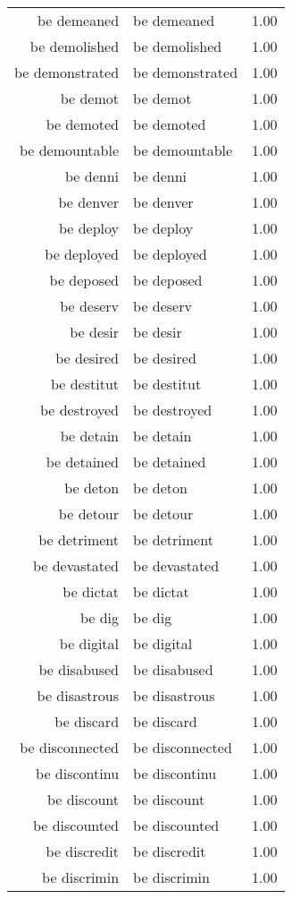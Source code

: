 \begin{table}[ht]
\begin{tabular}{rlr}
  be demeaned & be demeaned & 1.00 \\ 
  be demolished & be demolished & 1.00 \\ 
  be demonstrated & be demonstrated & 1.00 \\ 
  be demot & be demot & 1.00 \\ 
  be demoted & be demoted & 1.00 \\ 
  be demountable & be demountable & 1.00 \\ 
  be denni & be denni & 1.00 \\ 
  be denver & be denver & 1.00 \\ 
  be deploy & be deploy & 1.00 \\ 
  be deployed & be deployed & 1.00 \\ 
  be deposed & be deposed & 1.00 \\ 
  be deserv & be deserv & 1.00 \\ 
  be desir & be desir & 1.00 \\ 
  be desired & be desired & 1.00 \\ 
  be destitut & be destitut & 1.00 \\ 
  be destroyed & be destroyed & 1.00 \\ 
  be detain & be detain & 1.00 \\ 
  be detained & be detained & 1.00 \\ 
  be deton & be deton & 1.00 \\ 
  be detour & be detour & 1.00 \\ 
  be detriment & be detriment & 1.00 \\ 
  be devastated & be devastated & 1.00 \\ 
  be dictat & be dictat & 1.00 \\ 
  be dig & be dig & 1.00 \\ 
  be digital & be digital & 1.00 \\ 
  be disabused & be disabused & 1.00 \\ 
  be disastrous & be disastrous & 1.00 \\ 
  be discard & be discard & 1.00 \\ 
  be disconnected & be disconnected & 1.00 \\ 
  be discontinu & be discontinu & 1.00 \\ 
  be discount & be discount & 1.00 \\ 
  be discounted & be discounted & 1.00 \\ 
  be discredit & be discredit & 1.00 \\ 
  be discrimin & be discrimin & 1.00 \\ 

\end{tabular}
\end{table}
